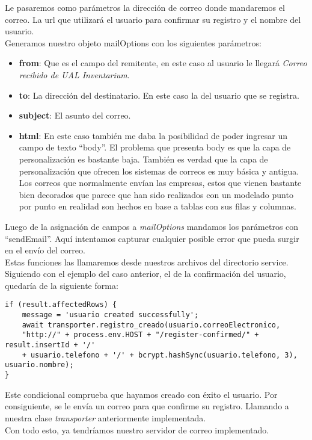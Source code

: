 Le pasaremos como parámetros la dirección de correo donde mandaremos el correo. La url que utilizará el usuario para confirmar su registro y el nombre del usuario.
\\Generamos nuestro objeto mailOptions con los siguientes parámetros:
\begin{itemize}
    \item \textbf{from}: Que es el campo del remitente, en este caso al usuario le llegará \textit{Correo recibido de UAL Inventarium}.
    \item \textbf{to}: La dirección del destinatario. En este caso la del usuario que se registra.
    \item \textbf{subject}: El asunto del correo.
    \item \textbf{html}: En este caso también me daba la posibilidad de poder ingresar un campo de texto ``body''. El problema que presenta body es que la capa de personalización es bastante baja. También es verdad que la capa de personalización que ofrecen los sistemas de correos es muy básica y antigua. Los correos que normalmente envían las empresas, estos que vienen bastante bien decorados que parece que han sido realizados con un modelado punto por punto en realidad son hechos en base a tablas con sus filas y columnas.
\end{itemize}
Luego de la asignación de campos a \textit{mailOptions} mandamos los parámetros con ``sendEmail''. Aquí intentamos capturar cualquier posible error que pueda surgir en el envío del correo.
\vspace{\baselineskip}
\\Estas funciones las llamaremos desde nuestros archivos del directorio service. Siguiendo con el ejemplo del caso anterior, el de la confirmación del usuario, quedaría de la siguiente forma:
\begin{verbatim}
if (result.affectedRows) {
    message = 'usuario created successfully';
    await transporter.registro_creado(usuario.correoElectronico, 
    "http://" + process.env.HOST + "/register-confirmed/" + result.insertId + '/'
    + usuario.telefono + '/' + bcrypt.hashSync(usuario.telefono, 3), usuario.nombre);
}
\end{verbatim}
Este condicional comprueba que hayamos creado con éxito el usuario. Por consiguiente, se le envía un correo para que confirme su registro. Llamando a nuestra clase \textit{transporter} anteriormente implementada.
\\Con todo esto, ya tendríamos nuestro servidor de correo implementado.

